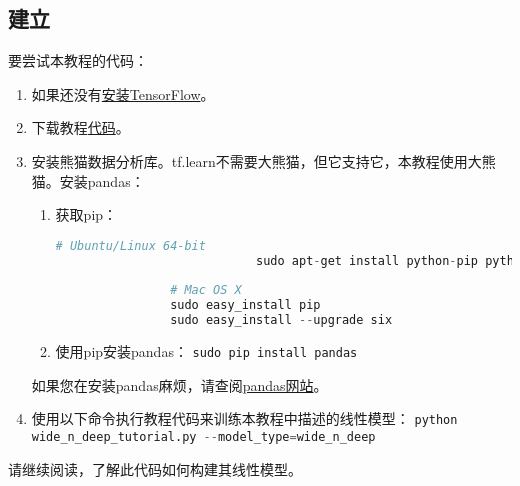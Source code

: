 \subsection{建立}
要尝试本教程的代码：
\begin{enumerate}
\item  如果还没有\href{https://www.tensorflow.org/install/index}{安装TensorFlow}。
\item 下载教程\href{https://www.github.com/tensorflow/tensorflow/blob/r1.3/tensorflow/examples/learn/wide_n_deep_tutorial.py}{代码}。
\item 安装熊猫数据分析库。tf.learn不需要大熊猫，但它支持它，本教程使用大熊猫。安装pandas：
	\begin{enumerate}
			\item 获取pip：
			\begin{lstlisting}[language=Python]
				# Ubuntu/Linux 64-bit
        	                sudo apt-get install python-pip python-dev
	
				# Mac OS X
				sudo easy_install pip
				sudo easy_install --upgrade six
			\end{lstlisting}

		\item 使用pip安装pandas：
			\lstinline[language=Python]{sudo pip install pandas}
	\end{enumerate}


如果您在安装pandas麻烦，请查阅\href{http://pandas.pydata.org/pandas-docs/stable/install.html}{pandas网站}。
\item 使用以下命令执行教程代码来训练本教程中描述的线性模型：
	\lstinline[language=Python]{python wide_n_deep_tutorial.py --model_type=wide_n_deep}
\end{enumerate}
请继续阅读，了解此代码如何构建其线性模型。
